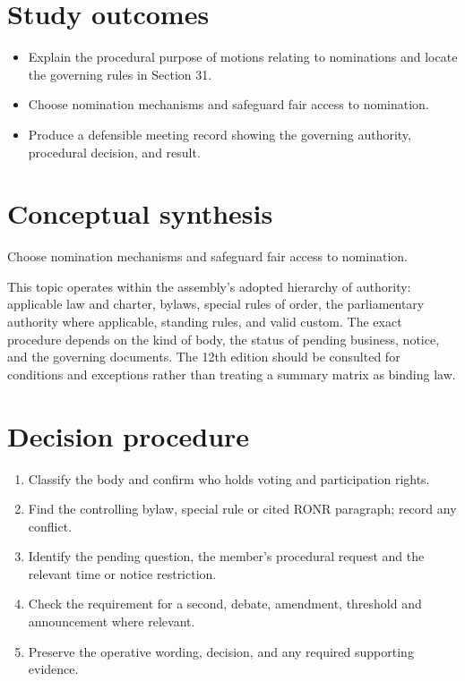 \documentclass[11pt]{article}
\begin{document}
\SuiteOpen
{}
\section{Study outcomes}
\begin{itemize}[leftmargin=*,itemsep=4pt]
\item Explain the procedural purpose of motions relating to nominations and locate the governing rules in Section 31.
\item Choose nomination mechanisms and safeguard fair access to nomination.
\item Produce a defensible meeting record showing the governing authority, procedural decision, and result.
\end{itemize}

\section{Conceptual synthesis}
Choose nomination mechanisms and safeguard fair access to nomination.

This topic operates within the assembly’s adopted hierarchy of authority: applicable law and charter, bylaws, special rules of order, the parliamentary authority where applicable, standing rules, and valid custom. The exact procedure depends on the kind of body, the status of pending business, notice, and the governing documents. The 12th edition should be consulted for conditions and exceptions rather than treating a summary matrix as binding law.
\section{Decision procedure}
\begin{enumerate}[leftmargin=*,itemsep=4pt]
\item Classify the body and confirm who holds voting and participation rights.
\item Find the controlling bylaw, special rule or cited RONR paragraph; record any conflict.
\item Identify the pending question, the member’s procedural request and the relevant time or notice restriction.
\item Check the requirement for a second, debate, amendment, threshold and announcement where relevant.
\item Preserve the operative wording, decision, and any required supporting evidence.
\end{enumerate}
\end{document}
